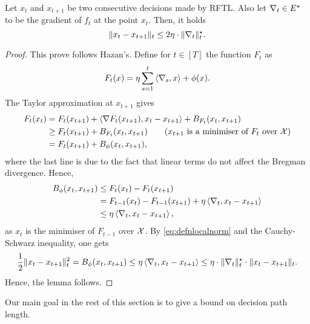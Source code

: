 \begin{lemma}
    Let $x_t$ and $x_{t+1}$ be two consecutive decisions made by RFTL. Also let $\nabla_t\in E^\star$ to be the gradient of $f_t$ at the point $x_t$. Then, it holds
    \[
        \|x_t - x_{t+1}\|_t \leq 2\eta\cdot \|\nabla_t\|_t^\star. 
    \]
\end{lemma}
\begin{proof}
    This prove follows Hazan's. Define for $t\in[T]$ the function $F_t$ as
    \[
        F_t(x) = \eta \sum_{s=1}^{t} \left\langle \nabla_s,x \right\rangle + \phi(x).
    \]
    The Taylor approximation at $x_{t+1}$ gives
    \begin{align*}
        F_t(x_t) &= F_t(x_{t+1}) + \left\langle \nabla F_t(x_{t+1}),x_t - x_{t+1} \right\rangle + B_{F_t}(x_t, x_{t+1}) \\
                 &\geq F_t(x_{t+1}) +  B_{F_t}(x_t, x_{t+1}) \quad\quad  \text{($x_{t+1}$ is a minimiser of $F_t$ over $\mathcal{X}$)} \\
                 &= F_t(x_{t+1}) +  B_\phi(x_t, x_{t+1}),
    \end{align*}
    where the last line is due to the fact that linear terms do not affect the Bregman divergence. Hence,
    \begin{align*}
        B_\phi(x_t, x_{t+1}) &\leq F_t(x_t) - F_t(x_{t+1}) \\
                             &= F_{t-1}(x_t) - F_{t-1}(x_{t+1}) + \eta\left\langle \nabla_t,x_t - x_{t+1} \right\rangle \\
                             &\leq \eta\left\langle \nabla_t,x_t - x_{t+1} \right\rangle,
    \end{align*}
    as $x_t$ is the minimiser of $F_{t-1}$ over $\mathcal{X}$. By \eqref{eq:defnlocalnorm} and the Cauchy-Schwarz inequality, one gets
    \begin{align*}
        \frac{1}{2}\|x_t - x_{t+1}\|_t^2 = B_\phi(x_t, x_{t+1}) \leq  \eta\left\langle \nabla_t,x_t - x_{t+1} \right\rangle \leq \eta\cdot \|\nabla_t\|_t^\star \cdot \|x_t - x_{t+1}\|_t.
    \end{align*}
    Hence, the lemma follows.
\end{proof}

 Our main goal in the rest of this section is to give a bound on decision path length.

